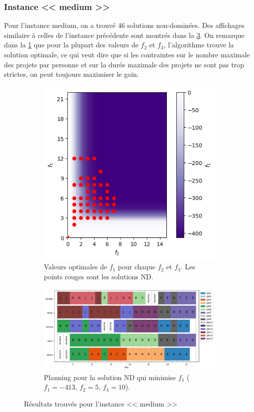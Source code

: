 \documentclass[12pt, a4paper, french, version=last, parskip=half, titlepage]{scrartcl}
\begin{document}
\subsubsection{Instance << medium >>}

Pour l'instance medium, on a trouvé 46 solutions non-dominées. Des affichages similaire à celles de l'instance précédente sont montrés dans la \cref{fig:medium}. On remarque dans la \cref{fig:medium-nd} que pour la plupart des valeurs de $f_2$ et $f_3$, l'algorithme trouve la solution optimale, ce qui veut dire que si les contraintes sur le nombre maximale des projets par personne et sur la durée maximale des projets ne sont pas trop strictes, on peut toujours maximiser le gain.

\begin{figure}[H]
    \centering
    \begin{subfigure}[t]{\textwidth}
        \centering
        \includegraphics[width=.4\textwidth]{images/plot_medium_nd.png}
        \caption{Valeurs optimales de $f_1$ pour chaque $f_2$ et $f_3$. Les points rouges sont les solutions ND.}
        \label{fig:medium-nd}
    \end{subfigure}
    \begin{subfigure}[t]{\textwidth}
        \centering
        \includegraphics[width=\textwidth]{images/plot_medium_planning.png}
        \caption{Planning pour la solution ND qui minimise $f_1$ ($f_1=-413$, $f_2=5$, $f_3=10$).}
        \label{fig:medium-planning}
    \end{subfigure}
    \caption{Résultats trouvés pour l'instance << medium >>}
    \label{fig:medium}
\end{figure}
\end{document}
